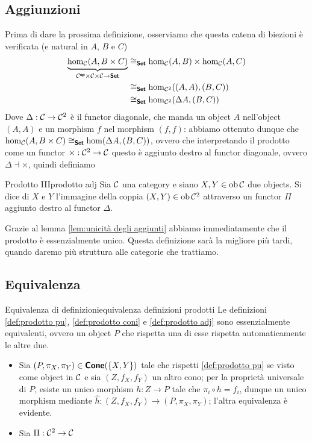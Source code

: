 \documentclass{article}
\renewcommand\C{\mc{C}}
\begin{document}
\subsection{Aggiunzioni}

Prima di dare la prossima definizione, osserviamo che questa catena di biezioni è verificata (e natural in $A$, $B$ e $C$)
\[\begin{aligned}
    \underbrace{\hom_\C(A, B\times C)}_{\C^\op \times \C\times\C \to \setcat} & \cong_\setcat \hom_\C(A,B)\times \hom_\C(A,C)\\
    & \cong_\setcat \hom_{\C^2}((A,A),(B,C))\\
    & \cong_\setcat \hom_{\C^2}(\Delta A,(B,C))
\end{aligned}\]
Dove $\Delta:\C\to\C^2$ è il functor diagonale, che manda un object $A$ nell'object $(A,A)$ e un morphism $f$ nel morphism $(f,f)$: abbiamo ottenuto dunque che $\hom_\C(A, B\times C) \cong_\setcat \hom(\Delta A, (B,C))$, ovvero che interpretando il prodotto come un functor $\times: \C^2\to\C$ questo è aggiunto destro al functor diagonale, ovvero $\Delta \dashv \times$, quindi definiamo

\begin{definition}{Prodotto III}{prodotto adj}
    Sia $\C$ una category e siano $X,Y \in \ob\C$ due objects. 
    Si dice  di $X$ e $Y$ l'immagine della coppia $(X,Y) \in \ob\C^2$ attraverso un functor $\Pi$ aggiunto destro al functor $\Delta$.
\end{definition}

Grazie al lemma \ref{lem:unicità degli aggiunti} abbiamo immediatamente che il prodotto è essenzialmente unico. Questa definizione sarà la migliore più tardi, quando daremo più struttura alle categorie che trattiamo.

\subsection{Equivalenza}

\begin{theorem}{Equivalenza di definizioni}{equivalenza definizioni prodotti}
    Le definizioni \ref{def:prodotto pu}, \ref{def:prodotto coni} e \ref{def:prodotto adj} sono essenzialmente equivalenti, ovvero un object $P$ che rispetta una di esse rispetta automaticamente le altre due.
    \proof 
    \begin{itemize}
        \item Sia $(P,\pi_X,\pi_Y) \in \text{\sffamily\textbf{Cone}}(\{X,Y\})$ tale che rispetti \ref{def:prodotto pu} se visto come object in $\C$ e sia $(Z,f_X,f_Y)$ un altro cono; per la proprietà universale di $P$, esiste un unico morphism $h : Z\to P$ tale che $\pi_i\circ h = f_i$, dunque un unico morphism mediante $\hat h : (Z,f_X,f_Y)\to (P,\pi_X,\pi_Y)$; l'altra equivalenza è evidente.
        \item Sia $\Pi : \C^2 \to \C$ 
    \end{itemize}
\end{theorem}
\end{document}
